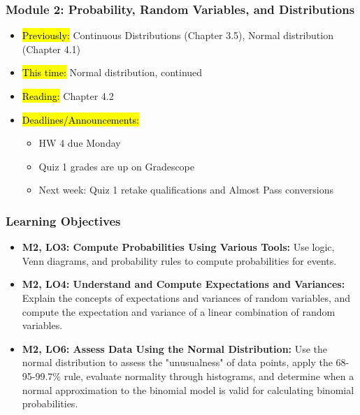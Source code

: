 
\begin{frame}
    \frametitle{Module 2: Probability, Random Variables, and Distributions}
    \begin{itemize}
        \item \hl{Previously: }Continuous Distributions (Chapter 3.5), Normal distribution (Chapter 4.1)
        \item \hl{This time: }Normal distribution, continued
        \item \hl{Reading: }Chapter 4.2
        \item \hl{Deadlines/Announcements: }
        \begin{itemize}
            \item HW 4 due Monday
            \item Quiz 1 grades are up on Gradescope
            \item Next week: Quiz 1 retake qualifications and Almost Pass conversions
        \end{itemize}
    \end{itemize}

\end{frame}

\begin{frame}
    \frametitle{Learning Objectives}
    \begin{itemize}
        \item \textbf{M2, LO3: Compute Probabilities Using Various Tools:} Use logic, Venn diagrams, and probability rules to compute probabilities for events.
        \item \textbf{M2, LO4: Understand and Compute Expectations and Variances:} Explain the concepts of expectations and variances of random variables, and compute the expectation and variance of a linear combination of random variables.
        \item \textbf{M2, LO6: Assess Data Using the Normal Distribution:} Use the normal distribution to assess the "unusualness" of data points, apply the 68-95-99.7\% rule, evaluate normality through histograms, and determine when a normal approximation to the binomial model is valid for calculating binomial probabilities.
    \end{itemize}
\end{frame}


